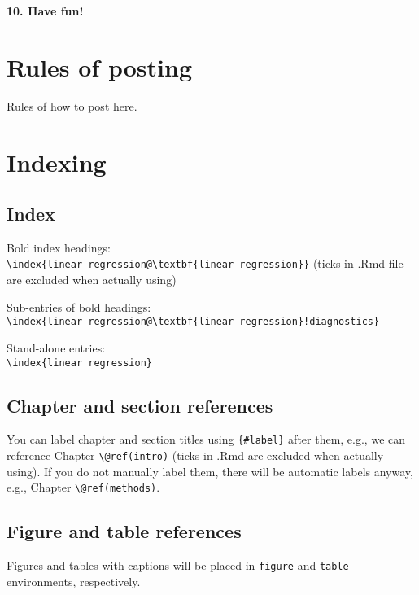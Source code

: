 \documentclass[]{book}
\begin{document}
\textbf{10. Have fun!}

\hypertarget{rules-of-posting}{%
\section{Rules of posting}\label{rules-of-posting}}

Rules of how to post here.

\hypertarget{indexing}{%
\section{Indexing}\label{indexing}}

\hypertarget{index}{%
\subsection{Index}\label{index}}

Bold index headings:\\
\texttt{\textbackslash{}index\{linear\ regression@\textbackslash{}textbf\{linear\ regression\}\}} (ticks in .Rmd file are excluded when actually using)

Sub-entries of bold headings:\\
\texttt{\textbackslash{}index\{linear\ regression@\textbackslash{}textbf\{linear\ regression\}!diagnostics\}}

Stand-alone entries:\\
\texttt{\textbackslash{}index\{linear\ regression\}}

\hypertarget{chapter-and-section-references}{%
\subsection{Chapter and section references}\label{chapter-and-section-references}}

You can label chapter and section titles using \texttt{\{\#label\}} after them, e.g., we can reference Chapter \texttt{\textbackslash{}@ref(intro)} (ticks in .Rmd are excluded when actually using). If you do not manually label them, there will be automatic labels anyway, e.g., Chapter \texttt{\textbackslash{}@ref(methods)}.

\hypertarget{figure-and-table-references}{%
\subsection{Figure and table references}\label{figure-and-table-references}}

Figures and tables with captions will be placed in \texttt{figure} and \texttt{table} environments, respectively.
\end{document}
